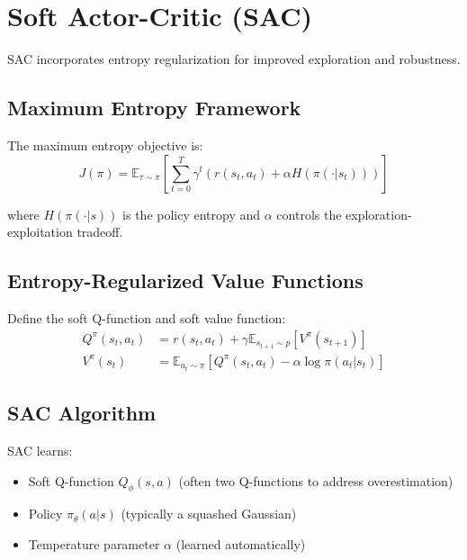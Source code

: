 \section{Soft Actor-Critic (SAC)}

SAC incorporates entropy regularization for improved exploration and robustness.

\subsection{Maximum Entropy Framework}

The maximum entropy objective is:
\begin{equation}
J(\pi) = \mathbb{E}_{\tau \sim \pi} \left[ \sum_{t=0}^T \gamma^t (r(s_t, a_t) + \alpha H(\pi(\cdot|s_t))) \right]
\end{equation}

where $H(\pi(\cdot|s))$ is the policy entropy and $\alpha$ controls the exploration-exploitation tradeoff.

\subsection{Entropy-Regularized Value Functions}

Define the soft Q-function and soft value function:
\begin{align}
Q^{\pi}(s_t, a_t) &= r(s_t, a_t) + \gamma \mathbb{E}_{s_{t+1} \sim p} [V^{\pi}(s_{t+1})] \\
V^{\pi}(s_t) &= \mathbb{E}_{a_t \sim \pi} [Q^{\pi}(s_t, a_t) - \alpha \log \pi(a_t|s_t)]
\end{align}

\subsection{SAC Algorithm}

SAC learns:
\begin{itemize}
    \item Soft Q-function $Q_\phi(s,a)$ (often two Q-functions to address overestimation)
    \item Policy $\pi_\theta(a|s)$ (typically a squashed Gaussian)
    \item Temperature parameter $\alpha$ (learned automatically)
\end{itemize}

